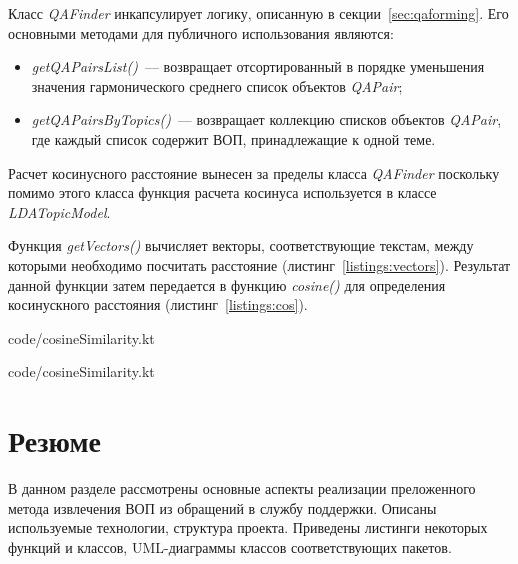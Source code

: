Класс \textit{QAFinder} инкапсулирует логику, описанную в секции~\ref{sec:qaforming}. Его основными методами для публичного использования являются:

\begin{itemize}
\item \textit{getQAPairsList()}~--- возвращает отсортированный в порядке уменьшения значения гармонического среднего список объектов \textit{QAPair};
\item \textit{getQAPairsByTopics()}~--- возвращает коллекцию списков объектов \textit{QAPair}, где каждый список содержит ВОП, принадлежащие к одной теме.
\end{itemize}

Расчет косинусного расстояние вынесен за пределы класса \textit{QAFinder} поскольку помимо этого класса функция расчета косинуса используется в классе \textit{LDATopicModel}. 

Функция \textit{getVectors()} вычисляет векторы, соответствующие текстам, между которыми необходимо посчитать расстояние (листинг~\ref{listings:vectors}). Результат данной функции затем передается в функцию \textit{cosine()} для определения косинускного расстояния (листинг~\ref{listings:cos}).


{code/cosineSimilarity.kt}


{code/cosineSimilarity.kt}

\section{Резюме}

В данном разделе рассмотрены основные аспекты реализации преложенного метода извлечения ВОП из обращений в службу поддержки. Описаны используемые технологии, структура проекта. Приведены листинги некоторых функций и классов, UML-диаграммы классов соответствующих пакетов.
